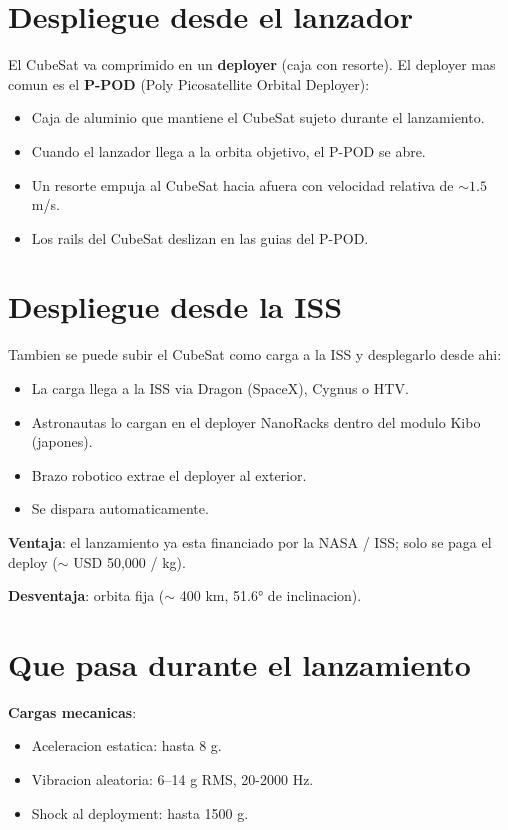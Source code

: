\documentclass[11pt,a4paper,oneside,openright]{book}
\begin{document}
\section{Despliegue desde el lanzador}

El CubeSat va comprimido en un \textbf{deployer} (caja con resorte). El
deployer mas comun es el \textbf{P-POD} (Poly Picosatellite Orbital
Deployer):

\begin{itemize}[leftmargin=2em]
  \item Caja de aluminio que mantiene el CubeSat sujeto durante el
        lanzamiento.
  \item Cuando el lanzador llega a la orbita objetivo, el P-POD se abre.
  \item Un resorte empuja al CubeSat hacia afuera con velocidad relativa
        de $\sim 1.5$ m/s.
  \item Los rails del CubeSat deslizan en las guias del P-POD.
\end{itemize}

\section{Despliegue desde la ISS}

Tambien se puede subir el CubeSat como carga a la ISS y desplegarlo desde
ahi:
\begin{itemize}[leftmargin=2em]
  \item La carga llega a la ISS via Dragon (SpaceX), Cygnus o HTV.
  \item Astronautas lo cargan en el deployer NanoRacks dentro del modulo
        Kibo (japones).
  \item Brazo robotico extrae el deployer al exterior.
  \item Se dispara automaticamente.
\end{itemize}

\textbf{Ventaja}: el lanzamiento ya esta financiado por la NASA / ISS;
solo se paga el deploy ($\sim$ USD 50,000 / kg).

\textbf{Desventaja}: orbita fija ($\sim$ 400 km, 51.6° de inclinacion).

\section{Que pasa durante el lanzamiento}

\textbf{Cargas mecanicas}:
\begin{itemize}[leftmargin=2em]
  \item Aceleracion estatica: hasta 8 g.
  \item Vibracion aleatoria: 6--14 g RMS, 20-2000 Hz.
  \item Shock al deployment: hasta 1500 g.
\end{itemize}
\end{document}

